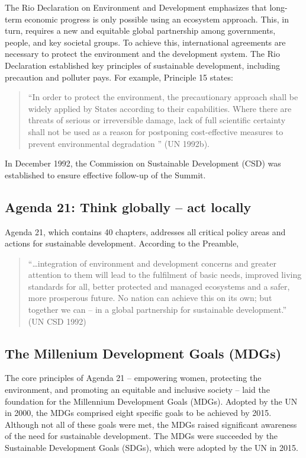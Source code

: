 \documentclass[
  a4paper,
  DIV=11,
  numbers=noendperiod,
  oneside,
  openany]{scrreprt}
\begin{document}
The Rio Declaration on Environment and Development emphasizes that
long-term economic progress is only possible using an ecosystem
approach. This, in turn, requires a new and equitable global partnership
among governments, people, and key societal groups. To achieve this,
international agreements are necessary to protect the environment and
the development system. The Rio Declaration established key principles
of sustainable development, including precaution and polluter pays. For
example, Principle 15 states:

\begin{quote}
``In order to protect the environment, the precautionary approach shall
be widely applied by States according to their capabilities. Where there
are threats of serious or irreversible damage, lack of full scientific
certainty shall not be used as a reason for postponing cost-effective
measures to prevent environmental degradation '' (UN 1992b).
\end{quote}

In December 1992, the Commission on Sustainable Development (CSD) was
established to ensure effective follow-up of the Summit.

\subsection{Agenda 21: Think globally -- act
locally}\label{agenda-21-think-globally-act-locally}

Agenda 21, which contains 40 chapters, addresses all critical policy
areas and actions for sustainable development. According to the
Preamble,

\begin{quote}
``\ldots integration of environment and development concerns and greater
attention to them will lead to the fulfilment of basic needs, improved
living standards for all, better protected and managed ecosystems and a
safer, more prosperous future. No nation can achieve this on its own;
but together we can -- in a global partnership for sustainable
development.'' (UN CSD 1992)
\end{quote}

\subsection{The Millenium Development Goals
(MDGs)}\label{the-millenium-development-goals-mdgs}

The core principles of Agenda 21 -- empowering women, protecting the
environment, and promoting an equitable and inclusive society -- laid
the foundation for the Millennium Development Goals (MDGs). Adopted by
the UN in 2000, the MDGs comprised eight specific goals to be achieved
by 2015. Although not all of these goals were met, the MDGs raised
significant awareness of the need for sustainable development. The MDGs
were succeeded by the Sustainable Development Goals (SDGs), which were
adopted by the UN in 2015.
\end{document}
